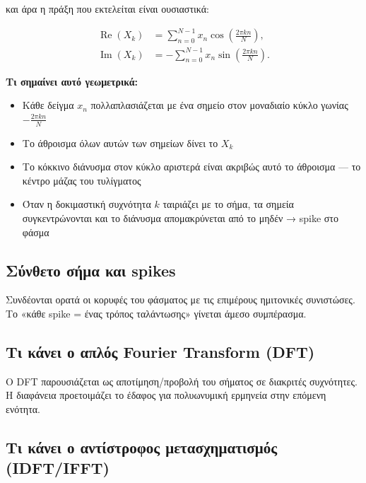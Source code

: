 \documentclass[a4paper, 11pt]{article}
\providecommand{\tightlist}{\setlength{\itemsep}{0pt}\setlength{\parskip}{0pt}}
\begin{document}
και άρα η πράξη που εκτελείται είναι ουσιαστικά:

\[\begin{split}
\operatorname{Re}(X_k) &= \sum_{n=0}^{N-1} x_n\cos\!\left(\frac{2\pi kn}{N}\right), \\
\operatorname{Im}(X_k) &= -\sum_{n=0}^{N-1} x_n\sin\!\left(\frac{2\pi kn}{N}\right).
\end{split}\]

\textbf{Τι σημαίνει αυτό γεωμετρικά:}

\begin{itemize}
\tightlist
\item
  Κάθε δείγμα \(x_n\) πολλαπλασιάζεται με ένα σημείο στον μοναδιαίο
  κύκλο γωνίας \(-\frac{2\pi kn}{N}\)
\item
  Το άθροισμα όλων αυτών των σημείων δίνει το \(X_k\)
\item
  Το κόκκινο διάνυσμα στον κύκλο αριστερά είναι ακριβώς αυτό το άθροισμα
  --- το κέντρο μάζας του τυλίγματος
\item
  Όταν η δοκιμαστική συχνότητα \(k\) ταιριάζει με το σήμα, τα σημεία
  συγκεντρώνονται και το διάνυσμα απομακρύνεται από το μηδέν → spike στο
  φάσμα
\end{itemize}

\subsection{Σύνθετο σήμα και
spikes}\label{ux3c3ux3cdux3bdux3b8ux3b5ux3c4ux3bf-ux3c3ux3aeux3bcux3b1-ux3baux3b1ux3b9-spikes}

Συνδέονται ορατά οι κορυφές του φάσματος με τις επιμέρους ημιτονικές
συνιστώσες. Το «κάθε spike = ένας τρόπος ταλάντωσης» γίνεται άμεσο
συμπέρασμα.

\subsection{Τι κάνει ο απλός Fourier Transform
(DFT)}\label{ux3c4ux3b9-ux3baux3acux3bdux3b5ux3b9-ux3bf-ux3b1ux3c0ux3bbux3ccux3c2-fourier-transform-dft}

Ο DFT παρουσιάζεται ως αποτίμηση/προβολή του σήματος σε διακριτές
συχνότητες. Η διαφάνεια προετοιμάζει το έδαφος για πολυωνυμική ερμηνεία
στην επόμενη ενότητα.

\subsection{Τι κάνει ο αντίστροφος μετασχηματισμός
(IDFT/IFFT)}\label{ux3c4ux3b9-ux3baux3acux3bdux3b5ux3b9-ux3bf-ux3b1ux3bdux3c4ux3afux3c3ux3c4ux3c1ux3bfux3c6ux3bfux3c2-ux3bcux3b5ux3c4ux3b1ux3c3ux3c7ux3b7ux3bcux3b1ux3c4ux3b9ux3c3ux3bcux3ccux3c2-idftifft}
\end{document}
